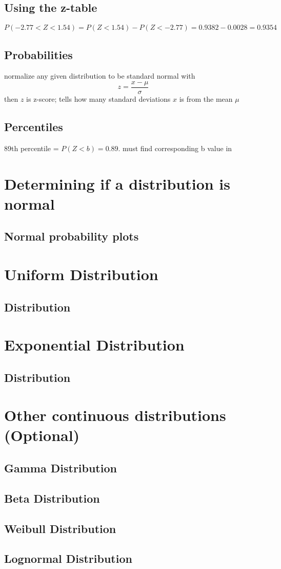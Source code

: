 \subsection{Using the z-table}  %
\begin{equation}
    P(-2.77<Z<1.54)=P(Z<1.54)-P(Z<-2.77)=0.9382 - 0.0028 = 0.9354
\end{equation}
    
\subsection{Probabilities}  %
normalize any given distribution to be standard normal with
\begin{equation}
    z=\frac{x-\mu}{\sigma}
\end{equation}
then $z$ is z-score; tells how many standard deviations $x$ is from the mean $\mu$
\subsection{Percentiles}  %
89th percentile = $P(Z<b)=0.89$. must find corresponding b value in 
\section{Determining if a distribution is normal}  %
\subsection{Normal probability plots}  %

\section{Uniform Distribution}  %
\subsection{Distribution}  %

\section{Exponential Distribution}  %
\subsection{Distribution}  %

\section{Other continuous distributions (Optional)}  %
\subsection{Gamma Distribution}  %
\subsection{Beta Distribution}  %
\subsection{Weibull Distribution}  %
\subsection{Lognormal Distribution}  %
